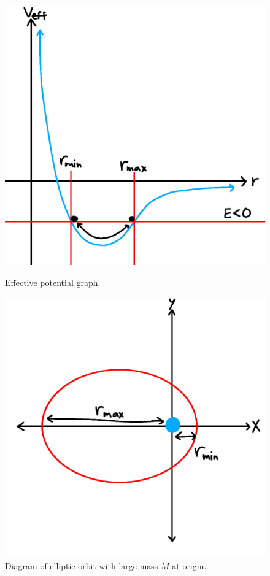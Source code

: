 \documentclass[12pt]{article}
\begin{document}
\begin{figure}[h]
\centering
\begin{minipage}{.5\textwidth}
  \centering
  \includegraphics[width=0.8\linewidth]{effective_potential}
  \caption{Effective potential graph.}
  \label{fig:effectivepotential}
\end{minipage}%
\begin{minipage}{.5\textwidth}
  \centering
  \includegraphics[width=0.8\linewidth]{elliptic_diagram}
  \caption{Diagram of elliptic orbit with large mass $M$ at origin.}
  \label{fig:ellipticdiagram}
\end{minipage}
\end{figure}
\end{document}
